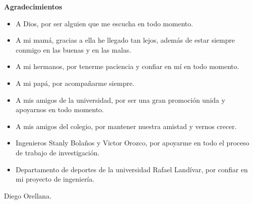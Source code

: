 \afterpage{\blankpage}
\newpage
{\LARGE \textbf{Agradecimientos}}\\[2cm]
\begin{itemize}
\item A Dios, por ser alguien que me escucha en todo momento.
\item A mi mam\'a, gracias a ella he llegado tan lejos, adem\'as de estar siempre conmigo en las buenas y en las malas. 
\item A mi hermanos, por tenerme paciencia y confiar en m\'i en todo momento.
\item A mi pap\'a, por acompa\~narme siempre.
\item A mis amigos de la universidad, por ser una gran promoci\'on unida y apoyarnos en todo momento.
\item A mis amigos del colegio, por mantener nuestra amistad y vernos crecer.
\item Ingenieros Stanly Bola\~nos y Victor Orozco, por apoyarme en todo el proceso de trabajo de investigaci\'on.
\item Departamento de deportes de la universidad Rafael Land\'ivar, por confiar en mi proyecto de ingenier\'ia.
\end{itemize}
\begin{center}
Diego Orellana.
\end{center}